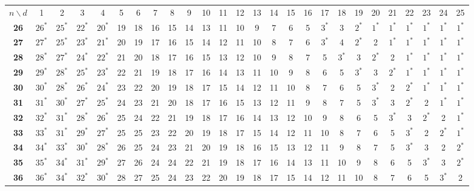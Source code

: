 
\begin{sidewaystable}
\smaller[2]
\centering
\setlength{\tabcolsep}{4.5pt}
\begin{tabular}{|c| c c c c c c c c c c c c c c c c c c c c c c c c c |}
\hline
$n \backslash  d$ & 1 & 2 & 3 & 4 & 5 & 6 & 7 & 8 & 9 & 10 & 11 & 12 & 13 & 14 & 15 & 16 & 17 & 18 & 19 & 20 & 21 & 22 & 23 & 24 & 25 \\
\Xhline{4\arrayrulewidth}
\textbf{26} & $26^*$ & $25^*$ & $22^*$ & $20^*$ & 19 & 18 & 16 & 15 & 14 & 13 & 11 & 10 & 9 & 7 & 6 & 5 & $3^*$ & 3 & $2^*$ & $1^*$ & $1^*$ & $1^*$ & $1^*$ & $1^*$ & $1^*$ \\
\textbf{27} & $27^*$ & $25^*$ & $23^*$ & $21^*$ & 20 & 19 & 17 & 16 & 15 & 14 & 12 & 11 & 10 & 8 & 7 & 6 & $3^*$ & 4 & $2^*$ & 2 & $1^*$ & $1^*$ & $1^*$ & $1^*$ & $1^*$ \\
\textbf{28} & $28^*$ & $27^*$ & $24^*$ & $22^*$ & 21 & 20 & 18 & 17 & 16 & 15 & 13 & 12 & 10 & 9 & 8 & 7 & 5 & $3^*$ & 3 & $2^*$ & 2 & $1^*$ & $1^*$ & $1^*$ & $1^*$ \\
\textbf{29} & $29^*$ & $28^*$ & $25^*$ & $23^*$ & 22 & 21 & 19 & 18 & 17 & 16 & 14 & 13 & 11 & 10 & 9 & 8 & 6 & 5 & $3^*$ & 3 & $2^*$ & $1^*$ & $1^*$ & $1^*$ & $1^*$ \\
\textbf{30} & $30^*$ & $28^*$ & $26^*$ & $24^*$ & 23 & 22 & 20 & 19 & 18 & 17 & 15 & 14 & 12 & 11 & 10 & 8 & 7 & 6 & 5 & $3^*$ & 2 & $2^*$ & $1^*$ & $1^*$ & $1^*$ \\
\textbf{31} & $31^*$ & $30^*$ & $27^*$ & $25^*$ & 24 & 23 & 21 & 20 & 18 & 17 & 16 & 15 & 13 & 12 & 11 & 9 & 8 & 7 & 5 & $3^*$ & 3 & $2^*$ & 2 & $1^*$ & $1^*$ \\
\textbf{32} & $32^*$ & $31^*$ & $28^*$ & $26^*$ & 25 & 24 & 22 & 21 & 19 & 18 & 17 & 16 & 14 & 13 & 12 & 10 & 9 & 8 & 6 & 5 & $3^*$ & 3 & $2^*$ & 2 & $1^*$ \\
\textbf{33} & $33^*$ & $31^*$ & $29^*$ & $27^*$ & 25 & 25 & 23 & 22 & 20 & 19 & 18 & 17 & 15 & 14 & 12 & 11 & 10 & 8 & 7 & 6 & 5 & $3^*$ & 2 & $2^*$ & $1^*$ \\
\textbf{34} & $34^*$ & $33^*$ & $30^*$ & $28^*$ & 26 & 25 & 24 & 23 & 21 & 20 & 19 & 18 & 16 & 15 & 13 & 12 & 11 & 9 & 8 & 7 & 5 & $3^*$ & 3 & 2 & $2^*$ \\
\textbf{35} & $35^*$ & $34^*$ & $31^*$ & $29^*$ & 27 & 26 & 24 & 24 & 22 & 21 & 19 & 18 & 17 & 16 & 14 & 13 & 11 & 10 & 9 & 8 & 6 & 5 & $3^*$ & 3 & $2^*$ \\
\textbf{36} & $36^*$ & $34^*$ & $32^*$ & $30^*$ & 28 & 27 & 25 & 24 & 23 & 22 & 20 & 19 & 18 & 17 & 15 & 14 & 12 & 11 & 10 & 8 & 7 & 6 & 5 & $3^*$ & 2 \\

\end{tabular}
\end{sidewaystable}
